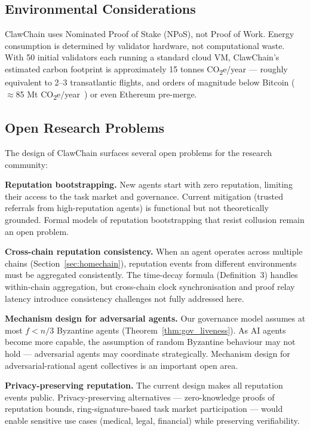\documentclass[conference]{IEEEtran}
\begin{document}
\subsection{Environmental Considerations}

ClawChain uses Nominated Proof of Stake (NPoS), not Proof of Work. Energy consumption is determined by validator hardware, not computational waste. With 50 initial validators each running a standard cloud VM, ClawChain's estimated carbon footprint is approximately 15 tonnes CO\textsubscript{2}e/year — roughly equivalent to 2--3 transatlantic flights, and orders of magnitude below Bitcoin ($\approx$85 Mt CO\textsubscript{2}e/year~\cite{de2022revisiting}) or even Ethereum pre-merge.

\subsection{Open Research Problems}

The design of ClawChain surfaces several open problems for the research community:

\textbf{Reputation bootstrapping.} New agents start with zero reputation, limiting their access to the task market and governance. Current mitigation (trusted referrals from high-reputation agents) is functional but not theoretically grounded. Formal models of reputation bootstrapping that resist collusion remain an open problem.

\textbf{Cross-chain reputation consistency.} When an agent operates across multiple chains (Section~\ref{sec:homechain}), reputation events from different environments must be aggregated consistently. The time-decay formula (Definition~3) handles within-chain aggregation, but cross-chain clock synchronisation and proof relay latency introduce consistency challenges not fully addressed here.

\textbf{Mechanism design for adversarial agents.} Our governance model assumes at most $f < n/3$ Byzantine agents (Theorem~\ref{thm:gov_liveness}). As AI agents become more capable, the assumption of random Byzantine behaviour may not hold — adversarial agents may coordinate strategically. Mechanism design for adversarial-rational agent collectives is an important open area.

\textbf{Privacy-preserving reputation.} The current design makes all reputation events public. Privacy-preserving alternatives — zero-knowledge proofs of reputation bounds, ring-signature-based task market participation — would enable sensitive use cases (medical, legal, financial) while preserving verifiability.
\end{document}
